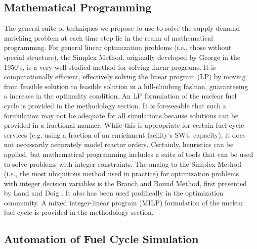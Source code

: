 \subsection{Mathematical Programming}

The general suite of techniques we propose to use to solve the supply-demand
matching problem at each time step lie in the realm of mathematical
programming. For general linear optimization problems (i.e., those without
special structure), the Simplex Method, originally developed by
George \cite{dantzig_generalized_1955} in the 1950's, is a very well studied
method for solving linear programs. It is computationally efficient, effectively
solving the linear program (LP) by moving from feasible solution to feasible
solution in a hill-climbing fashion, guaranteeing a increase in the optimality
condition. An LP formulation of the nuclear fuel cycle is provided in the
methodology section. It is foreseeable that such a formulation may not be adequate
for all simulations because solutions can be provided in a fractional
manner. While this is appropriate for certain fuel cycle services (e.g. using a
fraction of an enrichment facility's SWU capacity), it does not necessarily
accurately model reactor orders. Certainly, heuristics can be applied, but
mathematical programming includes a suite of tools that can be used to solve
problems with integer constraints. The analog to the Simplex Method (i.e., the
most ubiquitous method used in practice) for optimization problems with integer
decision variables is the Branch and Bound Method, first presented by Land and
Doig \cite{land_automatic_1960}. It also has been used prolifically in the
optimization community. A mixed integer-linear program (MILP) formulation of the
nuclear fuel cycle is provided in the methodology section.

\subsection{Automation of Fuel Cycle Simulation}

